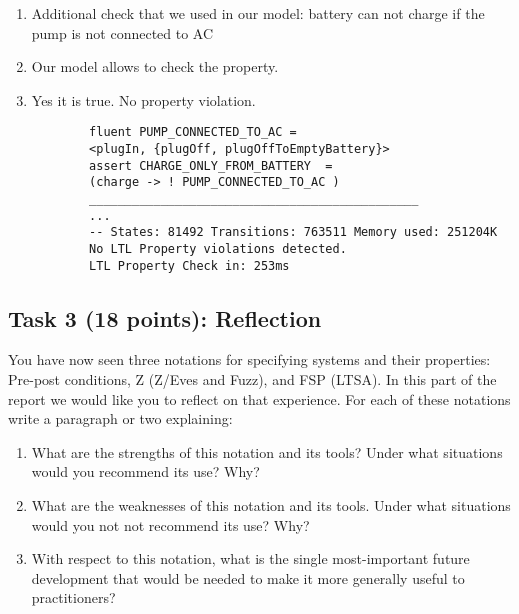 \documentclass{article}
\newcommand{\head}{\subsection*}
\begin{document}
\begin{enumerate}
\begin{itemize}
\begin{enumerate}
\begin{verbatim}
    	\end{verbatim}
    	\end{enumerate}
    	 \begin{enumerate}
    	\item Additional check that we used in our model: battery can not charge if the pump is not connected to AC
    	\item Our model allows to check the property.
    	 \item Yes it is true. No property violation.
    	 \begin{verbatim}
    	fluent PUMP_CONNECTED_TO_AC =
    	<plugIn, {plugOff, plugOffToEmptyBattery}>
    	assert CHARGE_ONLY_FROM_BATTERY  = 
    	(charge -> ! PUMP_CONNECTED_TO_AC )
    	______________________________________________
    	...
    	-- States: 81492 Transitions: 763511 Memory used: 251204K
    	No LTL Property violations detected.
    	LTL Property Check in: 253ms
    	\end{verbatim}
    	\end{enumerate}
    	\end{itemize}
    	    
\end{enumerate}

\head{Task 3 (18 points): Reflection}

 You have now seen three notations for specifying systems and their properties: Pre-post conditions,
 Z (Z/Eves and Fuzz), and FSP (LTSA).  In this part of the report we would like you to reflect on that experience.
 For each of these notations write a paragraph or two explaining:
\begin{enumerate}
 \item What are the strengths of this notation and its tools?  Under what situations would you
recommend its use? Why?
 \item What are the weaknesses of this notation and its tools. Under what
situations would you not not recommend its use? Why?
 \item With respect to this notation, what is
the single most-important future development that would be needed to make it more generally useful
to practitioners?
\end{enumerate}
\end{document}
